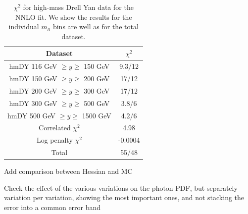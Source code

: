 \begin{table}[h]
  \centering
  \begin{tabular}{|c|c|}
    \hline
    Dataset  &   $\chi^2$ \\
    \hline
    \hline
    hmDY  116 GeV $\ge y\ge $ 150 GeV  &  9.3/12 \\
    hmDY  150 GeV $\ge y\ge $ 200 GeV  &  17/12 \\
    hmDY  200 GeV $\ge y\ge $ 300 GeV  &  17/12 \\
    hmDY  300 GeV $\ge y\ge $ 500 GeV  &  3.8/6 \\
    hmDY  500 GeV $\ge y\ge $ 1500 GeV  &  4.2/6 \\
    \hline
    Correlated $\chi^2$ & 4.98 \\
    Log penalty $\chi^2$  & -0.0004 \\
    \hline
    \hline
    Total  & 55/48 \\
    \hline
    \end{tabular}
  \caption{$\chi^{2}$ for high-mass Drell Yan data for the NNLO fit.
    We show the results for the individual $m_{ll}$ bins
    are well as for the total dataset.
\label{tab:chi2fit}
  }
\end{table}


Add comparison between Hessian and MC

Check the effect of the various variations on the photon PDF, but separately variation per variation,
showing the most important ones, and not stacking the error into a common error band
